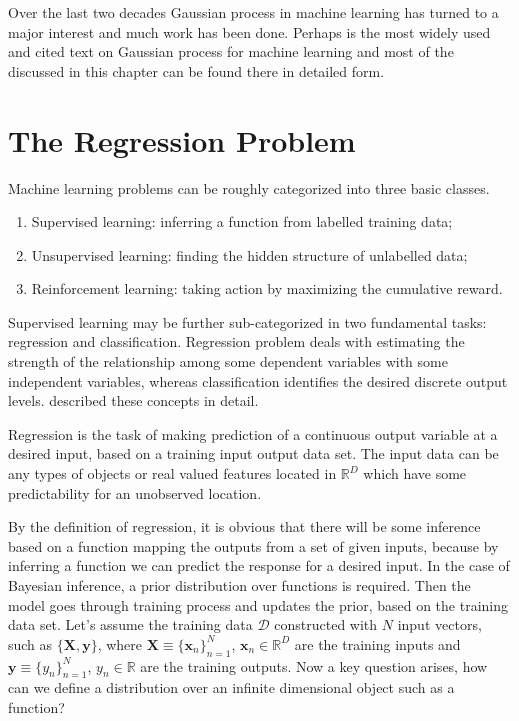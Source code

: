 Over the last two decades Gaussian process in machine learning has turned to a major interest and much work has been done. Perhaps \cite{Rasmussen_and_Williams:2006} is the most widely used and cited text on Gaussian process for machine learning and most of the discussed in this chapter can be found there in detailed form.

\section{The Regression Problem}
Machine learning problems can be roughly categorized into three basic classes. 
\begin{enumerate}
 \item Supervised learning: inferring a function from labelled training data;
 \item Unsupervised learning: finding the hidden structure of unlabelled data;
 \item Reinforcement learning: taking action by maximizing the cumulative reward. 
\end{enumerate}
Supervised learning may be further sub-categorized in two fundamental tasks: regression and classification. Regression problem deals with estimating the strength of the relationship among some dependent variables with some independent variables, whereas classification identifies the desired discrete output levels. \cite{MacKay:2003, Bishop:2006, Rogers:2011} described these concepts in detail.

Regression is the task of making prediction of a continuous output variable at a desired input, based on a training input output data set. The input data can be any types of objects or real valued features located in $\mathbb{R}^D$ which have some predictability for an unobserved location. 

By the definition of regression, it is obvious that there will be some inference based on a function mapping the outputs from a set of given inputs, because by inferring a function we can predict the response for a desired input. In the case of Bayesian inference, a prior distribution over functions is required. Then the model goes through training process and updates the prior, based on the training data set. Let's assume the training data $\mathcal{D}$ constructed with $N$ input vectors, such as $\{\textbf{X},\textbf{y}\}$, where $\textbf{X}\equiv{\{{\textbf{x}_n}\}_{n=1}^N}$, $ \textbf{x}_n\in\mathbb{R}^D $  are the training inputs and $\textbf{y}\equiv{\{{y_n}\}_{n=1}^N}$, $y_n\in\mathbb{R}$ are the training outputs. Now a key question arises, how can we define a distribution over an infinite dimensional object such as a function?


